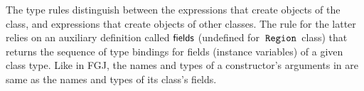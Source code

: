 

The type rules distinguish between the  expressions that create
objects of  the \RgnZ class, and  expressions that create
objects of other classes. The rule for the latter relies on an
auxiliary definition called ${\sf fields}$ (undefined for $\,{\tt Region}\,$ class)
that returns the sequence of type bindings for fields (instance
variables) of a given class type.  Like in FGJ, the names and types of
a constructor's arguments in \FB are same as the names and types of
its class's fields.  

